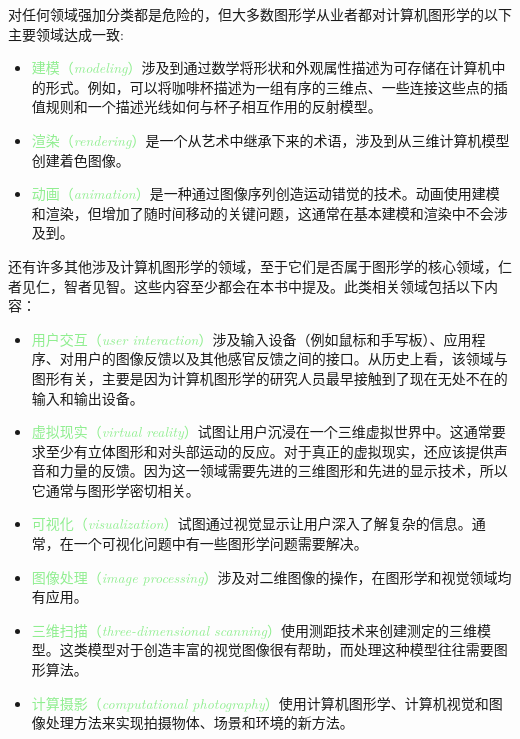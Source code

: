 \documentclass[lang=cn,12pt]{elegantbook}
\begin{document}
对任何领域强加分类都是危险的，但大多数图形学从业者都对计算机图形学的以下主要领域达成一致:

\begin{itemize}
\item \textcolor{lightgreen}{建模（\textit{modeling}）}涉及到通过数学将形状和外观属性描述为可存储在计算机中的形式。例如，可以将咖啡杯描述为一组有序的三维点、一些连接这些点的插值规则和一个描述光线如何与杯子相互作用的反射模型。
\item \textcolor{lightgreen}{渲染（\textit{rendering}）}是一个从艺术中继承下来的术语，涉及到从三维计算机模型创建着色图像。
\item \textcolor{lightgreen}{动画（\textit{animation}）}是一种通过图像序列创造运动错觉的技术。动画使用建模和渲染，但增加了随时间移动的关键问题，这通常在基本建模和渲染中不会涉及到。
\end{itemize}

还有许多其他涉及计算机图形学的领域，至于它们是否属于图形学的核心领域，仁者见仁，智者见智。这些内容至少都会在本书中提及。此类相关领域包括以下内容：

\begin{itemize}
\item \textcolor{lightgreen}{用户交互（\textit{user interaction}）}涉及输入设备（例如鼠标和手写板）、应用程序、对用户的图像反馈以及其他感官反馈之间的接口。从历史上看，该领域与图形有关，主要是因为计算机图形学的研究人员最早接触到了现在无处不在的输入和输出设备。
\item \textcolor{lightgreen}{虚拟现实（\textit{virtual reality}）}试图让用户沉浸在一个三维虚拟世界中。这通常要求至少有立体图形和对头部运动的反应。对于真正的虚拟现实，还应该提供声音和力量的反馈。因为这一领域需要先进的三维图形和先进的显示技术，所以它通常与图形学密切相关。
\item \textcolor{lightgreen}{可视化（\textit{visualization}）}试图通过视觉显示让用户深入了解复杂的信息。通常，在一个可视化问题中有一些图形学问题需要解决。
\item \textcolor{lightgreen}{图像处理（\textit{image processing}）}涉及对二维图像的操作，在图形学和视觉领域均有应用。
\item \textcolor{lightgreen}{三维扫描（\textit{three-dimensional scanning}）}使用测距技术来创建测定的三维模型。这类模型对于创造丰富的视觉图像很有帮助，而处理这种模型往往需要图形算法。
\item \textcolor{lightgreen}{计算摄影（\textit{computational photography}）}使用计算机图形学、计算机视觉和图像处理方法来实现拍摄物体、场景和环境的新方法。
\end{itemize}
\end{document}
